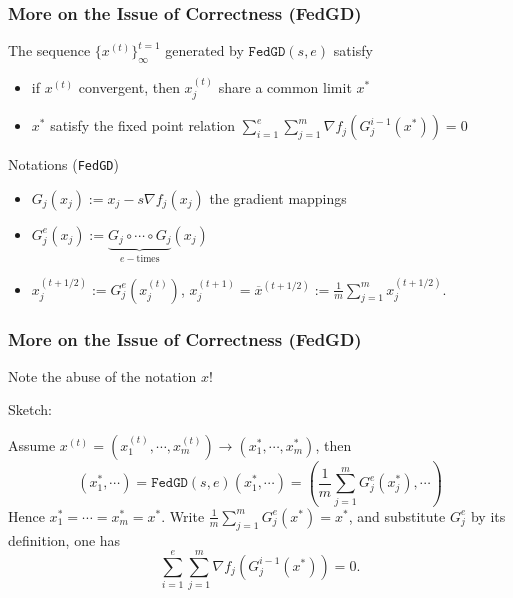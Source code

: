 
\begin{frame}
\frametitle{More on the Issue of Correctness (FedGD)}

\begin{prop}
The sequence $\{x^{(t)}\}^{t=1}_{\infty}$ generated by $\texttt{FedGD}(s,e)$ satisfy
\begin{itemize}
    \item if $x^{(t)}$ convergent, then $x_j^{(t)}$ share a common limit $x^*$
    \vspace{-0.3em}
    \item $x^*$ satisfy the fixed point relation {\smaller$\sum\limits_{i=1}^e\sum\limits_{j=1}^m \nabla f_j(G_j^{i-1}(x^*)) = 0$}
\end{itemize}
\end{prop}

\begin{block}{Notations (\texttt{FedGD})}
\begin{itemize}
\item $G_j(x_j) := x_j - s\nabla f_j(x_j)$ the gradient mappings
\item $G^e_j(x_j) := \underbrace{G_j\circ\cdots\circ G_j}_{e-\text{times}} (x_j)$
\item $x_j^{(t+1/2)} := G^e_j(x_j^{(t)})$, $x_j^{(t+1)} = \overline{x}^{(t+1/2)}:=\frac{1}{m}\sum\limits_{j=1}^m x_j^{(t+1/2)}.$
\end{itemize}
\end{block}

\end{frame}


\begin{frame}
\frametitle{More on the Issue of Correctness (FedGD)}

Note the abuse of the notation $x$!

Sketch:

Assume $x^{(t)} = (x_1^{(t)}, \cdots, x_m^{(t)}) \to (x_1^{*}, \cdots, x_m^{*})$, then
$$(x_1^{*}, \cdots) = \texttt{FedGD}(s,e)(x_1^{*}, \cdots) = \left(\frac{1}{m}\sum\limits_{j=1}^m G^e_j(x_j^{*}), \cdots \right)$$
Hence $x_1^{*} = \cdots = x_m^{*} = x^{*}.$ Write $\frac{1}{m}\sum_{j=1}^m G^e_j(x^{*}) = x^{*}$, and substitute $G^e_j$ by its definition, one has
\vspace{-0.7em}
$$\sum\limits_{i=1}^e\sum\limits_{j=1}^m \nabla f_j(G_j^{i-1}(x^*)) = 0.$$

\end{frame}

